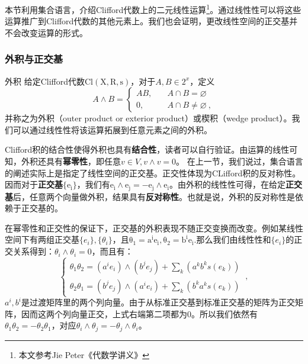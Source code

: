 



本节利用集合语言，介绍Clifford代数上的二元线性运算\footnote{本文参考Jie Peter《代数学讲义》}。通过线性性可以将这些运算推广到Clifford代数的其他元素上。我们也会证明，更改线性空间的正交基并不会改变运算的形式。
\subsubsection{外积与正交基}
\begin{definition}{外积}
给定Clifford代数$\mathrm {Cl(X,R,s)}$，对于$A,B\in 2^x$，定义
\begin{equation}
A \wedge B=\left\{\begin{aligned}
A B,\quad& A \cap B=\varnothing \\
0,\quad& A \cap B \neq \varnothing~,
\end{aligned}\right.
\end{equation}
并称之为外积（outer product or exterior product）或楔积（wedge product）。我们可以通过线性性将该运算拓展到任意元素之间的外积。
\end{definition}


Clifford积的结合性使得外积也具有\textbf{结合性}，读者可以自行验证。由运算的线性可知，外积还具有\textbf{幂零性}，即任意$v\in V,v\wedge v=0$。
在上一节，我们说过，集合语言的阐述实际上是指定了线性空间的正交基。正交性体现为CLifford积的反对称性。因而对于\textbf{正交基}$\{\mathrm {e_i}\}$，我们有$\mathrm{e_i\wedge e_j=-e_j\wedge e_i}$。由外积的线性性可得，在给定\textbf{正交基}后，任意两个向量做外积，结果具有\textbf{反对称性}。也就是说，外积的反对称性是依赖于正交基的。


在幂零性和正交性的保证下，正交基的外积表现不随正交变换而改变。例如某线性空间下有两组正交基$\{e_i\},\{\theta_i\}$，且$\mathrm {\theta_1=a^i e_i,\theta_2=b^i e_i}$.那么我们由线性性和$\{e_i\}$的正交关系得到：$\theta_i\wedge\theta_i=0$，而且有：
\begin{equation}
\left\{\begin{array}{l}
\theta_1 \theta_2=\left(a^i e_i\right) \wedge\left(b^j e_j\right)+\sum_k\left(a^k b^k s(e_k)\right) \\
\theta_2 \theta_1=\left(b^j e_j\right) \wedge\left(a^i e_i\right)+\sum_k\left(b^k a^k s(e_k)\right)
\end{array}\right.~,
\end{equation}
$a^i,b^i$是过渡矩阵里的两个列向量。由于从标准正交基到标准正交基的矩阵为正交矩阵，因而这两个列向量正交，上式右端第二项都为0。所以我们依然有$\theta_1\theta_2=-\theta_2\theta_1$，对应$\theta_i\wedge\theta_j=-\theta_j\wedge\theta_i$。
